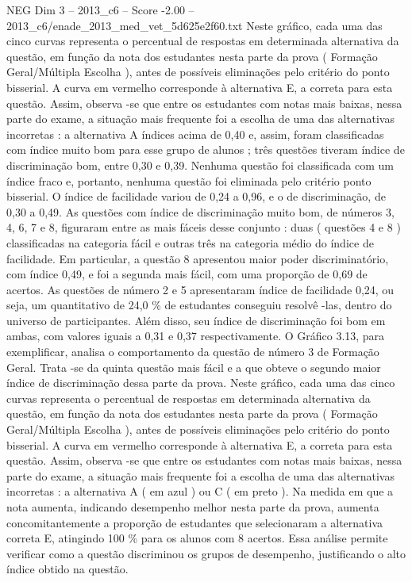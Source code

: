 \begin{textsample}{NEG Dim 3 – 2013\_c6 – Score -2.00 – 2013\_c6/enade\_2013\_med\_vet\_5d625e2f60.txt}
Neste gráfico, cada uma das cinco curvas representa o percentual de respostas em determinada alternativa da questão, em função da nota dos estudantes nesta parte da prova ( Formação Geral/Múltipla Escolha ), antes de possíveis eliminações pelo critério do ponto bisserial.
A curva em vermelho corresponde à alternativa E, a correta para esta questão.
Assim, observa -se que entre os estudantes com notas mais baixas, nessa parte do exame, a situação mais frequente foi a escolha de uma das alternativas incorretas : a alternativa A índices acima de 0,40 e, assim, foram classificadas com índice muito bom para esse grupo de alunos ; três questões tiveram índice de discriminação bom, entre 0,30 e 0,39.
Nenhuma questão foi classificada com um índice fraco e, portanto, nenhuma questão foi eliminada pelo critério ponto bisserial.
O índice de facilidade variou de 0,24 a 0,96, e o de discriminação, de 0,30 a 0,49.
As questões com índice de discriminação muito bom, de números 3, 4, 6, 7 e 8, figuraram entre as mais fáceis desse conjunto : duas ( questões 4 e 8 ) classificadas na categoria fácil e outras três na categoria médio do índice de facilidade.
Em particular, a questão 8 apresentou maior poder discriminatório, com índice 0,49, e foi a segunda mais fácil, com uma proporção de 0,69 de acertos.
As questões de número 2 e 5 apresentaram índice de facilidade 0,24, ou seja, um quantitativo de 24,0 \% de estudantes conseguiu resolvê -las, dentro do universo de participantes.
Além disso, seu índice de discriminação foi bom em ambas, com valores iguais a 0,31 e 0,37 respectivamente.
O Gráfico 3.13, para exemplificar, analisa o comportamento da questão de número 3 de Formação Geral.
Trata -se da quinta questão mais fácil e a que obteve o segundo maior índice de discriminação dessa parte da prova.
Neste gráfico, cada uma das cinco curvas representa o percentual de respostas em determinada alternativa da questão, em função da nota dos estudantes nesta parte da prova ( Formação Geral/Múltipla Escolha ), antes de possíveis eliminações pelo critério do ponto bisserial.
A curva em vermelho corresponde à alternativa E, a correta para esta questão.
Assim, observa -se que entre os estudantes com notas mais baixas, nessa parte do exame, a situação mais frequente foi a escolha de uma das alternativas incorretas : a alternativa A ( em azul ) ou C ( em preto ).
Na medida em que a nota aumenta, indicando desempenho melhor nesta parte da prova, aumenta concomitantemente a proporção de estudantes que selecionaram a alternativa correta E, atingindo 100 \% para os alunos com 8 acertos.
Essa análise permite verificar como a questão discriminou os grupos de desempenho, justificando o alto índice obtido na questão.

\end{textsample}
